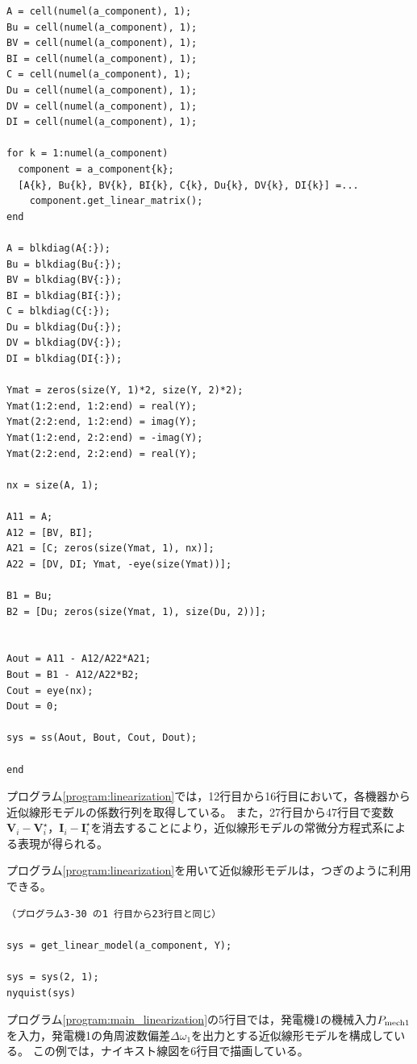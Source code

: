 \documentclass[tombow,dvipdfmx]{corona-a5-1.1}
\begin{document}
\begin{例}[近似線形モデルの実装]
\begin{PROGRAMA}[count,title={get\_linear\_model.m}]
\begin{verbatim}
A = cell(numel(a_component), 1);
Bu = cell(numel(a_component), 1);
BV = cell(numel(a_component), 1);
BI = cell(numel(a_component), 1);
C = cell(numel(a_component), 1);
Du = cell(numel(a_component), 1);
DV = cell(numel(a_component), 1);
DI = cell(numel(a_component), 1);

for k = 1:numel(a_component)
  component = a_component{k};
  [A{k}, Bu{k}, BV{k}, BI{k}, C{k}, Du{k}, DV{k}, DI{k}] =...
    component.get_linear_matrix();
end

A = blkdiag(A{:});
Bu = blkdiag(Bu{:});
BV = blkdiag(BV{:});
BI = blkdiag(BI{:});
C = blkdiag(C{:});
Du = blkdiag(Du{:});
DV = blkdiag(DV{:});
DI = blkdiag(DI{:});

Ymat = zeros(size(Y, 1)*2, size(Y, 2)*2);
Ymat(1:2:end, 1:2:end) = real(Y);
Ymat(2:2:end, 1:2:end) = imag(Y);
Ymat(1:2:end, 2:2:end) = -imag(Y);
Ymat(2:2:end, 2:2:end) = real(Y);

nx = size(A, 1);

A11 = A;
A12 = [BV, BI];
A21 = [C; zeros(size(Ymat, 1), nx)];
A22 = [DV, DI; Ymat, -eye(size(Ymat))];

B1 = Bu;
B2 = [Du; zeros(size(Ymat, 1), size(Du, 2))];


Aout = A11 - A12/A22*A21;
Bout = B1 - A12/A22*B2;
Cout = eye(nx);
Dout = 0;

sys = ss(Aout, Bout, Cout, Dout);

end
\end{verbatim}
\end{PROGRAMA}

プログラム\ref{program:linearization}では，12行目から16行目において，各機器から近似線形モデルの係数行列を取得している。
また，27行目から47行目で変数$\bm{V}_i-\bm{V}_i^\star$，$\bm{I}_i - \bm{I}_i^\star$を消去することにより，近似線形モデルの常微分方程式系による表現が得られる。

プログラム\ref{program:linearization}を用いて近似線形モデルは，つぎのように利用できる。

\smallskip
\begin{PROGRAMA}[count,title={load\_impedance.m}]\label{program:main_linearization}
\begin{verbatim}
（プログラム3-30 の1 行目から23行目と同じ）

sys = get_linear_model(a_component, Y);

sys = sys(2, 1);
nyquist(sys)
\end{verbatim}
\end{PROGRAMA}

プログラム\ref{program:main_linearization}の5行目では，発電機1の機械入力$P_{{\rm mech}1}$を入力，発電機1の角周波数偏差$\Delta\omega_1$を出力とする近似線形モデルを構成している。
この例では，ナイキスト線図を6行目で描画している。
\end{例}
\end{document}
